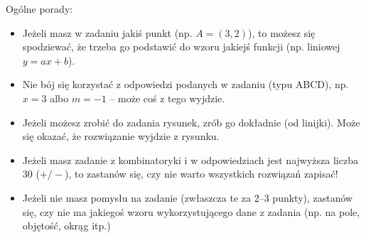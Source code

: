\documentclass[12pt,a4paper]{article}
\theoremstyle{break}
\begin{document}
\vspace{2cm}
{\Large Ogólne porady:}
\begin{itemize}
	\item Jeżeli masz w zadaniu jakiś punkt (np. $A=(3,2)$), to możesz się spodziewać, że trzeba go podstawić do wzoru jakiejś funkcji (np. liniowej $y=ax+b$).
	\item Nie bój się korzystać z odpowiedzi podanych w zadaniu (typu ABCD), np. $x=3$ albo $m=-1$ – może coś z tego wyjdzie.
	\item Jeżeli możesz zrobić do zadania rysunek, zrób go dokładnie (od linijki). Może się okazać, że rozwiązanie wyjdzie z rysunku.
	\item Jeżeli masz zadanie z kombinatoryki i w odpowiedziach jest najwyższa liczba 30 ($+/-$), to zastanów się, czy nie warto wszystkich rozwiązań zapisać!
	\item Jeżeli nie masz pomysłu na zadanie (zwłaszcza te za 2–3 punkty), zastanów się, czy nie ma jakiegoś wzoru wykorzystującego dane z zadania (np. na pole, objętość, okrąg itp.)
\end{itemize}

	
\end{document}
